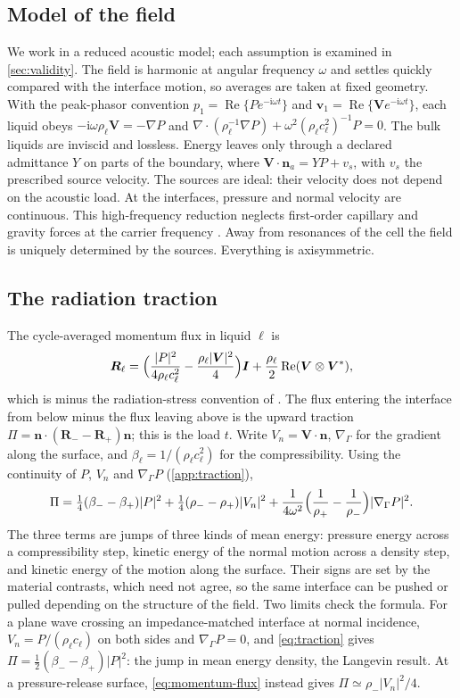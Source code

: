 \documentclass[11pt,a4paper]{article}
\numberwithin{equation}{section}
\newcommand{\nn}{\bm n}
\newcommand{\Id}{\bm I}
\newcommand{\Gs}{\nabla_\Gamma}
\DeclareMathOperator{\Rea}{Re}
\begin{document}
\subsection{Model of the field}
We work in a reduced acoustic model; each assumption is examined in
\cref{sec:validity}. The field is harmonic at angular frequency $\omega$ and
settles quickly compared with the interface motion, so averages are taken at
fixed geometry. With the peak-phasor convention
$p_1=\Rea\{Pe^{-\mathrm i\omega t}\}$ and
$\bm v_1=\Rea\{\bm Ve^{-\mathrm i\omega t}\}$, each liquid obeys
$-\mathrm i\omega\rho_\ell\bm V=-\nabla P$ and
$\nabla\cdot(\rho_\ell^{-1}\nabla P)+\omega^2(\rho_\ell c_\ell^2)^{-1}P=0$. The
bulk liquids are inviscid and lossless. Energy leaves only through a declared
admittance $Y$ on parts of the boundary, where
$\bm V\cdot\bm n_a=YP+v_s$, with $v_s$ the prescribed source velocity. The
sources are ideal: their velocity does not depend on the acoustic load. At the
interfaces, pressure and normal velocity are continuous. This high-frequency
reduction neglects first-order capillary and gravity forces at the carrier
frequency \cite{chesneau2022}. Away from resonances of the cell the field is
uniquely determined by the sources. Everything is axisymmetric.

\subsection{The radiation traction}
The cycle-averaged momentum flux in liquid $\ell$ is \cite{chesneau2022}
\begin{equation}
 \bm R_\ell=\Bigl(\frac{|P|^2}{4\rho_\ell c_\ell^2}
            -\frac{\rho_\ell|\bm V|^2}{4}\Bigr)\Id
   +\frac{\rho_\ell}{2}\Rea(\bm V\otimes\bm V^*),
 \label{eq:momentum-flux}
\end{equation}
which is minus the radiation-stress convention of \cite{chesneau2022}. The flux
entering the interface from below minus the flux leaving above is the upward
traction $\Pi=\nn\cdot(\bm R_--\bm R_+)\nn$; this is the load $t$. Write
$V_n=\bm V\cdot\nn$, $\Gs$ for the gradient along the surface, and
$\beta_\ell=1/(\rho_\ell c_\ell^2)$ for the compressibility. Using the
continuity of $P$, $V_n$ and $\Gs P$ (\cref{app:traction}),
\begin{equation}
 \Pi=\tfrac14(\beta_--\beta_+)|P|^2
    +\tfrac14(\rho_--\rho_+)|V_n|^2
    +\frac{1}{4\omega^2}\Bigl(\frac1{\rho_+}-\frac1{\rho_-}\Bigr)|\Gs P|^2 .
 \label{eq:traction}
\end{equation}
The three terms are jumps of three kinds of mean energy: pressure energy across
a compressibility step, kinetic energy of the normal motion across a density
step, and kinetic energy of the motion along the surface. Their signs are set
by the material contrasts, which need not agree, so the same interface can be
pushed or pulled depending on the structure of the field. Two limits check the
formula. For a plane wave crossing an impedance-matched interface at normal
incidence, $V_n=P/(\rho_\ell c_\ell)$ on both sides and $\Gs P=0$, and
\cref{eq:traction} gives $\Pi=\tfrac12(\beta_--\beta_+)|P|^2$: the jump in mean
energy density, the Langevin result. At a pressure-release surface,
\cref{eq:momentum-flux} instead gives $\Pi\simeq\rho_-|V_n|^2/4$.
\end{document}
